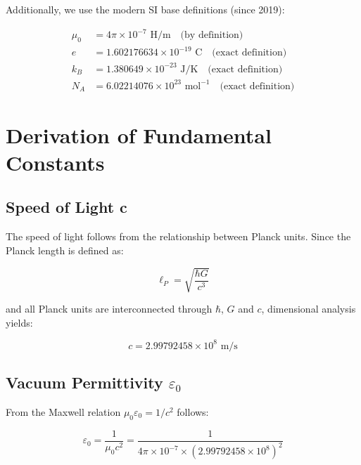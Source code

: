 	Additionally, we use the modern SI base definitions (since 2019):
	
	\begin{align}
		\mu_0 &= 4\pi \times 10^{-7} \text{ H/m} \quad \text{(by definition)}\\
		e &= 1.602176634 \times 10^{-19} \text{ C} \quad \text{(exact definition)}\\
		k_B &= 1.380649 \times 10^{-23} \text{ J/K} \quad \text{(exact definition)}\\
		N_A &= 6.02214076 \times 10^{23} \text{ mol}^{-1} \quad \text{(exact definition)}
	\end{align}
	
	\section{Derivation of Fundamental Constants}
	
	\subsection{Speed of Light c}
	
	The speed of light follows from the relationship between Planck units. Since the Planck length is defined as:
	
	\begin{equation}
		\ell_P = \sqrt{\frac{\hbar G}{c^3}}
	\end{equation}
	
	and all Planck units are interconnected through $\hbar$, $G$ and $c$, dimensional analysis yields:
	
	\begin{tcolorbox}[colback=green!5!white,colframe=green!75!black,title=Speed of Light]
		\begin{equation}
			\boxed{c = 2.99792458 \times 10^8 \text{ m/s}}
		\end{equation}
	\end{tcolorbox}
	
	\subsection{Vacuum Permittivity $\varepsilon_0$}
	
	From the Maxwell relation $\mu_0 \varepsilon_0 = 1/c^2$ follows:
	
	\begin{equation}
		\varepsilon_0 = \frac{1}{\mu_0 c^2} = \frac{1}{4\pi \times 10^{-7} \times (2.99792458 \times 10^8)^2}
	\end{equation}
	
